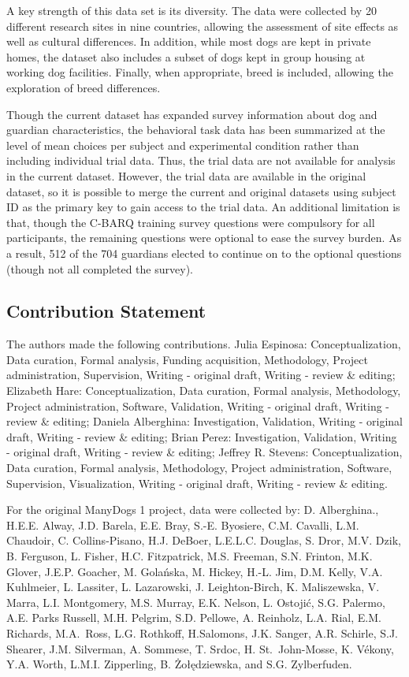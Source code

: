 \documentclass[
  man,floatsintext]{apa6}
\begin{document}
A key strength of this data set is its diversity. The data were collected by 20 different research sites in nine countries, allowing the assessment of site effects as well as cultural differences. In addition, while most dogs are kept in private homes, the dataset also includes a subset of dogs kept in group housing at working dog facilities. Finally, when appropriate, breed is included, allowing the exploration of breed differences.

Though the current dataset has expanded survey information about dog and guardian characteristics, the behavioral task data has been summarized at the level of mean choices per subject and experimental condition rather than including individual trial data. Thus, the trial data are not available for analysis in the current dataset. However, the trial data are available in the original dataset, so it is possible to merge the current and original datasets using subject ID as the primary key to gain access to the trial data. An additional limitation is that, though the C-BARQ training survey questions were compulsory for all participants, the remaining questions were optional to ease the survey burden. As a result, 512 of the 704 guardians elected to continue on to the optional questions (though not all completed the survey).

\hypertarget{contribution-statement}{%
\subsection{Contribution Statement}\label{contribution-statement}}

The authors made the following contributions. Julia Espinosa: Conceptualization, Data curation, Formal analysis, Funding acquisition, Methodology, Project administration, Supervision, Writing - original draft, Writing - review \& editing; Elizabeth Hare: Conceptualization, Data curation, Formal analysis, Methodology, Project administration, Software, Validation, Writing - original draft, Writing - review \& editing; Daniela Alberghina: Investigation, Validation, Writing - original draft, Writing - review \& editing; Brian Perez: Investigation, Validation, Writing - original draft, Writing - review \& editing; Jeffrey R. Stevens: Conceptualization, Data curation, Formal analysis, Methodology, Project administration, Software, Supervision, Visualization, Writing - original draft, Writing - review \& editing.

For the original ManyDogs 1 project, data were collected by: D. Alberghina., H.E.E. Alway, J.D. Barela, E.E. Bray, S.-E. Byosiere, C.M. Cavalli, L.M. Chaudoir, C. Collins-Pisano, H.J. DeBoer, L.E.L.C. Douglas, S. Dror, M.V. Dzik, B. Ferguson, L. Fisher, H.C. Fitzpatrick, M.S. Freeman, S.N. Frinton, M.K. Glover, J.E.P. Goacher, M. Golańska, M.
Hickey, H.-L. Jim, D.M. Kelly, V.A. Kuhlmeier, L. Lassiter, L. Lazarowski, J. Leighton-Birch, K. Maliszewska, V. Marra, L.I. Montgomery, M.S. Murray, E.K. Nelson, L. Ostojić, S.G. Palermo, A.E. Parks Russell, M.H. Pelgrim, S.D. Pellowe, A. Reinholz, L.A. Rial, E.M. Richards, M.A.~Ross, L.G. Rothkoff, H.Salomons, J.K. Sanger, A.R. Schirle, S.J. Shearer, J.M. Silverman, A. Sommese, T. Srdoc, H. St.~John-Mosse, K. Vékony, Y.A. Worth, L.M.I. Zipperling, B. Żołędziewska, and S.G. Zylberfuden.
\end{document}
